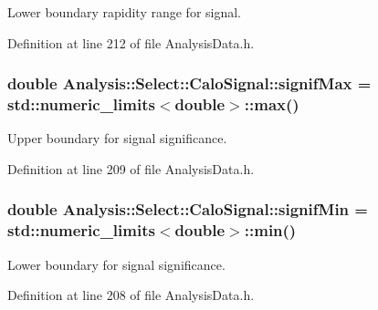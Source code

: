 Lower boundary rapidity range for signal. 



Definition at line 212 of file Analysis\+Data.\+h.

\subsubsection[{\texorpdfstring{signif\+Max}{signifMax}}]{\setlength{\rightskip}{0pt plus 5cm}double Analysis\+::\+Select\+::\+Calo\+Signal\+::signif\+Max = std\+::numeric\+\_\+limits$<$double$>$\+::max()\hspace{0.3cm}{\ttfamily [static]}}\hypertarget{namespaceAnalysis_1_1Select_1_1CaloSignal_a2bb73d45f1bf8d8d81e7be8a8d247e47}{}\label{namespaceAnalysis_1_1Select_1_1CaloSignal_a2bb73d45f1bf8d8d81e7be8a8d247e47}


Upper boundary for signal significance. 



Definition at line 209 of file Analysis\+Data.\+h.

\subsubsection[{\texorpdfstring{signif\+Min}{signifMin}}]{\setlength{\rightskip}{0pt plus 5cm}double Analysis\+::\+Select\+::\+Calo\+Signal\+::signif\+Min = std\+::numeric\+\_\+limits$<$double$>$\+::min()\hspace{0.3cm}{\ttfamily [static]}}\hypertarget{namespaceAnalysis_1_1Select_1_1CaloSignal_a84374213c119a3c9850969eb36fca6d9}{}\label{namespaceAnalysis_1_1Select_1_1CaloSignal_a84374213c119a3c9850969eb36fca6d9}


Lower boundary for signal significance. 



Definition at line 208 of file Analysis\+Data.\+h.

